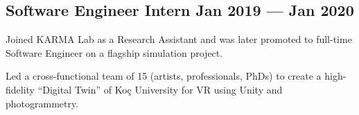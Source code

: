 \subsection{{Software Engineer Intern \hfill Jan 2019 --- Jan 2020}}
\begin{zitemize}
\item Joined KARMA Lab as a Research Assistant and was later promoted to full-time Software Engineer on a flagship simulation project.  
\item Led a cross-functional team of 15 (artists, professionals, PhDs) to create a high-fidelity “Digital Twin” of Koç University for VR using Unity and photogrammetry.  
\end{zitemize}

